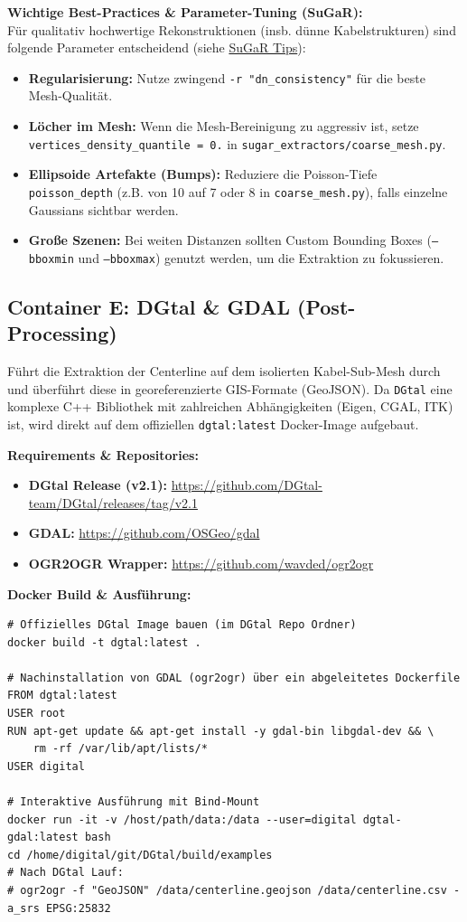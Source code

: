 \documentclass[12pt,a4paper]{article}
\begin{document}
\textbf{Wichtige Best-Practices \& Parameter-Tuning (SuGaR):}\\
Für qualitativ hochwertige Rekonstruktionen (insb. dünne Kabelstrukturen) sind folgende Parameter entscheidend (siehe \href{https://github.com/Anttwo/SuGaR}{SuGaR Tips}):
\begin{itemize}[noitemsep]
    \item \textbf{Regularisierung:} Nutze zwingend \texttt{-r "dn\_consistency"} für die beste Mesh-Qualität.
    \item \textbf{Löcher im Mesh:} Wenn die Mesh-Bereinigung zu aggressiv ist, setze \texttt{vertices\_density\_quantile = 0.} in \texttt{sugar\_extractors/coarse\_mesh.py}.
    \item \textbf{Ellipsoide Artefakte (Bumps):} Reduziere die Poisson-Tiefe \texttt{poisson\_depth} (z.B. von 10 auf 7 oder 8 in \texttt{coarse\_mesh.py}), falls einzelne Gaussians sichtbar werden.
    \item \textbf{Große Szenen:} Bei weiten Distanzen sollten Custom Bounding Boxes (\texttt{--bboxmin} und \texttt{--bboxmax}) genutzt werden, um die Extraktion zu fokussieren.
\end{itemize}


\subsection*{Container E: DGtal \& GDAL (Post-Processing)}
Führt die Extraktion der Centerline auf dem isolierten Kabel-Sub-Mesh durch und überführt diese in georeferenzierte GIS-Formate (GeoJSON). Da \texttt{DGtal} eine komplexe C++ Bibliothek mit zahlreichen Abhängigkeiten (Eigen, CGAL, ITK) ist, wird direkt auf dem offiziellen \texttt{dgtal:latest} Docker-Image aufgebaut.

\textbf{Requirements \& Repositories:}
\begin{itemize}[noitemsep]
    \item \textbf{DGtal Release (v2.1):} \url{https://github.com/DGtal-team/DGtal/releases/tag/v2.1}
    \item \textbf{GDAL:} \url{https://github.com/OSGeo/gdal}
    \item \textbf{OGR2OGR Wrapper:} \url{https://github.com/wavded/ogr2ogr}
\end{itemize}

\textbf{Docker Build \& Ausführung:}
\begin{verbatim}
# Offizielles DGtal Image bauen (im DGtal Repo Ordner)
docker build -t dgtal:latest .

# Nachinstallation von GDAL (ogr2ogr) über ein abgeleitetes Dockerfile
FROM dgtal:latest
USER root
RUN apt-get update && apt-get install -y gdal-bin libgdal-dev && \
    rm -rf /var/lib/apt/lists/*
USER digital

# Interaktive Ausführung mit Bind-Mount
docker run -it -v /host/path/data:/data --user=digital dgtal-gdal:latest bash
cd /home/digital/git/DGtal/build/examples
# Nach DGtal Lauf:
# ogr2ogr -f "GeoJSON" /data/centerline.geojson /data/centerline.csv -a_srs EPSG:25832
\end{verbatim}
\end{document}

